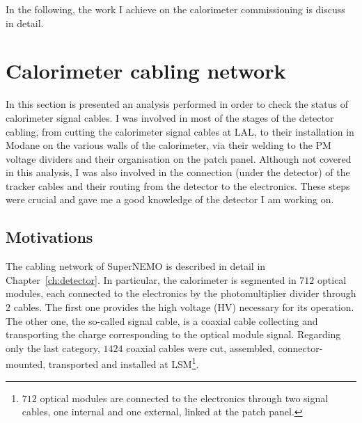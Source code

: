 In the following, the work I achieve on the calorimeter commissioning is discuss in detail.


\section{Calorimeter cabling network}
\label{sec:reflecto}

In this section is presented an analysis performed in order to check the status of calorimeter signal cables.
I was involved in most of the stages of the detector cabling, from cutting the calorimeter signal cables at LAL, to their installation in Modane on the various walls of the calorimeter, via their welding to the PM voltage dividers and their organisation on the patch panel.
Although not covered in this analysis, I was also involved in the connection (under the detector) of the tracker cables and their routing from the detector to the electronics.
These steps were crucial and gave me a good knowledge of the detector I am working on.

\subsection{Motivations}

The cabling network of SuperNEMO is described in detail in Chapter~\ref{ch:detector}.
In particular, the calorimeter is segmented in $712$ optical modules, each connected to the electronics by the photomultiplier divider through $2$ cables.
The first one provides the high voltage (HV) necessary for its operation.
The other one, the so-called signal cable, is a coaxial cable collecting and transporting the charge corresponding to the optical module signal.
Regarding only the last category, $1424$ coaxial cables were cut, assembled, connector-mounted, transported and installed at LSM\footnote{$712$ optical modules are connected to the electronics through two signal cables, one internal and one external, linked at the patch panel.}.

